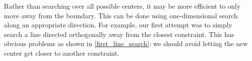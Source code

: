 % 
% 
% 
% 
% 

Rather than searching over all possible centers, it may be more efficient to only move away from the boundary.
This can be done using one-dimensional search along an appropriate direction.
For example, our first attempt was to simply search a line directed orthogonally away from the closest constraint.
This has obvious problems as shown in \cref{first_line_search}: we should avoid letting the new center get closer to another constraint.    



